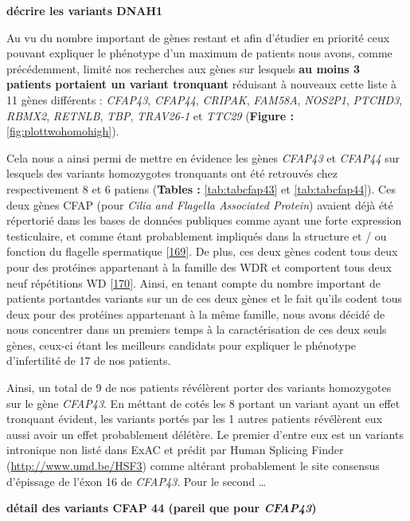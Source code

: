 \documentclass[12pt,twoside]{reedthesis}
\theoremstyle{definition}
\theoremstyle{definition}
\theoremstyle{remark}
\begin{document}
  \textbf{décrire les variants DNAH1}
  
  Au vu du nombre important de gènes restant et afin d'étudier en priorité
  ceux pouvant expliquer le phénotype d'un maximum de patients nous avons,
  comme précédemment, limité nos recherches aux gènes sur lesquels
  \textbf{au moins 3 patients portaient un variant tronquant} réduisant à
  nouveaux cette liste à 11 gènes différents : \emph{CFAP43},
  \emph{CFAP44}, \emph{CRIPAK}, \emph{FAM58A}, \emph{NOS2P1},
  \emph{PTCHD3}, \emph{RBMX2}, \emph{RETNLB}, \emph{TBP}, \emph{TRAV26-1}
  et \emph{TTC29} (\textbf{Figure : }\ref{fig:plottwohomohigh}).
  
  Cela nous a ainsi permi de mettre en évidence les gènes \emph{CFAP43} et
  \emph{CFAP44} sur lesquels des variants homozygotes tronquants ont été
  retrouvés chez respectivement 8 et 6 patiens (\textbf{Tables :
  }\ref{tab:tabcfap43} et \ref{tab:tabcfap44}). Ces deux gènes CFAP (pour
  \emph{Cilia and Flagella Associated Protein}) avaient déjà été
  répertorié dans les bases de données publiques comme ayant une forte
  expression testiculaire, et comme étant probablement impliqués dans la
  structure et / ou fonction du flagelle spermatique
  {[}\protect\hyperlink{ref-Ivliev2012}{169}{]}. De plus, ces deux gènes
  codent tous deux pour des protéines appartenant à la famille des WDR et
  comportent tous deux neuf répétitions WD
  {[}\protect\hyperlink{ref-Smith2008}{170}{]}. Ainsi, en tenant compte du
  nombre important de patients portantdes variants sur un de ces deux
  gènes et le fait qu'ils codent tous deux pour des protéines appartenant
  à la même famille, nous avons décidé de nous concentrer dans un premiers
  temps à la caractérisation de ces deux seuls gènes, ceux-ci étant les
  meilleurs candidats pour expliquer le phénotype d'infertilité de 17 de
  nos patients.
  
  Ainsi, un total de 9 de nos patients révélèrent porter des variants
  homozygotes sur le gène \emph{CFAP43}. En méttant de cotés les 8 portant
  un variant ayant un effet tronquant évident, les variants portés par les
  1 autres patients révélèrent eux aussi avoir un effet probablement
  délétère. Le premier d'entre eux est un variants intronique non listé
  dans ExAC et prédit par Human Splicing Finder
  (\url{http://www.umd.be/HSF3}) comme altérant probablement le site
  consensus d'épissage de l'éxon 16 de \emph{CFAP43}. Pour le second
  \ldots{}
  
  \textbf{détail des variants CFAP 44 (pareil que pour \emph{CFAP43})}
  
\end{document}
